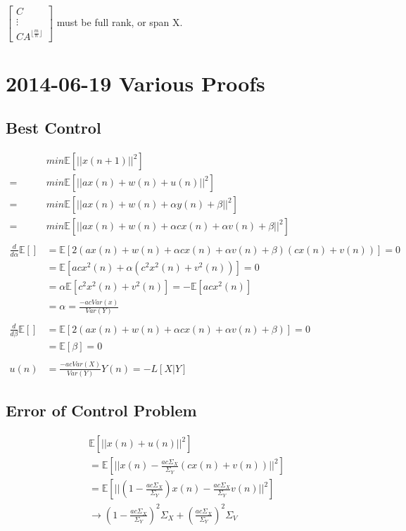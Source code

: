 \documentclass[leqno,twocolumn]{article}
\begin{document}
$\left[ \begin{matrix}
C \\ \vdots \\ CA^{\lfloor\frac{m}{n}\rfloor}
\end{matrix} \right]$ must be full rank, or span X.

\section{2014-06-19 Various Proofs}
\subsection{Best Control}
\begin{align*}
& min \mathbb{E}[||x(n+1)||^2]\\
=& min \mathbb{E}[||ax(n) + w(n) + u(n)||^2]\\
=& min \mathbb{E}[||ax(n) + w(n) + \alpha y(n) + \beta ||^2]\\
=& min \mathbb{E}[||ax(n) + w(n) + \alpha cx(n) + \alpha v(n) + \beta ||^2]\\
\\
\frac{d}{d\alpha} \mathbb{E}[] &= \mathbb{E}[2(ax(n) + w(n) + \alpha cx(n) + \alpha v(n) + \beta)(cx(n) + v(n))] = 0\\
&= \mathbb{E}[acx^2(n) + \alpha (c^2x^2(n) + v^2(n))] = 0\\
&= \alpha \mathbb{E}[c^2x^2(n)+v^2(n)] = -\mathbb{E}[acx^2(n)]\\
&= \alpha = \frac{-acVar(x)}{Var(Y)}\\
\\
\frac{d}{d\beta} \mathbb{E}[] &= \mathbb{E}[2(ax(n) + w(n) + \alpha cx(n) + \alpha v(n) + \beta)] = 0\\
&= \mathbb{E}[\beta] = 0\\
\\
u(n) &= \frac{-acVar(X)}{Var(Y)}Y(n) = -L[X|Y]
\end{align*}

\subsection{Error of Control Problem}
\begin{align*}
& \mathbb{E}[||x(n) + u(n)||^2]\\
&= \mathbb{E}[||x(n) - \frac{ac\Sigma_X}{\Sigma_Y}(cx(n) + v(n))||^2]\\
&= \mathbb{E}[||(1-\frac{ac\Sigma_X}{\Sigma_Y})x(n) - \frac{ac\Sigma_X}{\Sigma_Y} v(n) ||^2]\\
&\rightarrow \boxed{(1-\frac{ac\Sigma_X}{\Sigma_Y})^2\Sigma_X + (\frac{ac\Sigma_X}{\Sigma_Y})^2\Sigma_V}
\end{align*}
\end{document}
